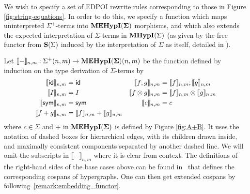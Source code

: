 We wish to specify a set of EDPOI rewrite rules corresponding to those in Figure \ref{fig:string-equations}.
In order to do this,  we specify a function which maps  uninterpreted $\Sigma^+$-terms into ${\mathbf{MEHypI(\Sigma)}}$ morphisms,  and which also extends the expected interpretation of $\Sigma$-terms in $\textbf{MHypI}(\Sigma)$ (as given by the free functor from $\mathbf{S}(\Sigma)$ induced by the interpretation of $\Sigma$ as itself,  detailed in \cite{bonchi_string_2022-2}). 
\begin{definition}[Interpretation function] 
Let $\llbracket - \rrbracket_{n,m}: \Sigma^+(n,m) \to {\mathbf{MEHypI(\Sigma)}}(n,m)$ be the function defined by induction on the type derivation of $\Sigma$-terms by 
\begin{align*}
	\llbracket \textsf{id} \rrbracket_{n,m} &= \textsf{id}  &	\llbracket f ; g \rrbracket_{n,m} &= \llbracket f \rrbracket_{n,m} ; \llbracket g \rrbracket_{n,m} \\
	\llbracket I \rrbracket_{n,m} &= I & \llbracket f \otimes g \rrbracket_{n,m} &= \llbracket f \rrbracket_{n,m} \otimes \llbracket g \rrbracket_{n,m} \\
	\llbracket \textsf{sym} \rrbracket_{n,m} &= \textsf{sym}  & \llbracket c \rrbracket_{n,m} &= c   \\ 
	\llbracket f+g \rrbracket_{n,m} &= \llbracket f \rrbracket_{n,m} + \llbracket g \rrbracket_{n,m}
\end{align*}
where $c \in \Sigma$ and $+$ in ${\mathbf{MEHypI(\Sigma)}}$ is defined by Figure \ref{fig:A+B}.  It uses the notation of dashed boxes for hierarchical edges, with its children drawn inside,  and maximally consistent components separated by another dashed line.  We will omit the subscripts in $\llbracket - \rrbracket_{n,m}$ where it is clear from context.
The definitions of the right-hand sides of the base cases above can be found in~\cite{bonchi_string_2022-1} that defines the corresponding cospans of hypergraphs. One can then get extended cospans by following~\ref{remark:embedding_functor}.
\end{definition}

